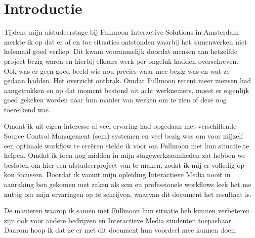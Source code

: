 \setcounter{chapter}{0}
\chapter{Introductie}
  
Tijdens mijn afstudeerstage bij Fullmoon Interactive Solutions in Amsterdam merkte ik op dat er af en toe situaties ontstonden waarbij het samenwerken niet helemaal goed verliep. Dit kwam voornamelijk doordat mensen aan hetzelfde project bezig waren en hierbij elkaars werk per ongeluk hadden overschreven. Ook was er geen goed beeld wie nou precies waar mee bezig was en wat ze gedaan hadden. Het overzicht ontbrak. Omdat Fullmoon recent meer mensen had aangetrokken en op dat moment bestond uit acht werknemers, moest er eigenlijk goed gekeken worden naar hun manier van werken om te zien of deze nog toereikend was.

Omdat ik uit eigen interesse al veel ervaring had opgedaan met verschillende Source Control Management ({\sc scm}) systemen en veel bezig was om voor mijzelf een optimale workflow te creëren stelde ik voor om Fullmoon met hun situatie te helpen. Omdat ik toen nog midden in mijn stagewerkzaamheden zat hebben we besloten om hier een afstudeerproject van te maken, zodat ik mij er volledig op kon focussen. Doordat ik vanuit mijn opleiding Interactieve Media nooit in aanraking ben gekomen met zaken als {\sc scm} en professionele workflows leek het me nuttig om mijn ervaringen op te schrijven, waarvan dit document het resultaat is.

De manieren waarop ik samen met Fullmoon hun situatie heb kunnen verbeteren zijn ook voor andere bedrijven en Interactieve Media studenten toepasbaar. Daarom hoop ik dat ze er met dit document hun voordeel mee kunnen doen.
